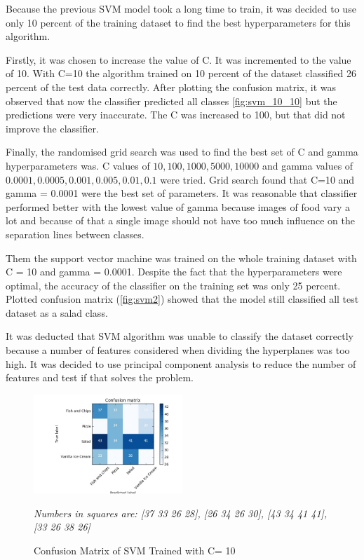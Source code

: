 Because the previous SVM model took a long time to train, it was decided to use only 10 percent of the training dataset to find the best hyperparameters for this algorithm.

Firstly, it was chosen to increase the value of C. It was incremented to the value of 10. With C=10 the algorithm trained on 10 percent of the dataset classified 26 percent of the test data correctly. After plotting the confusion matrix, it was observed that now the classifier predicted all classes \autoref{fig:svm_10_10} but the predictions were very inaccurate. The C was increased to 100, but that did not improve the classifier.

Finally, the  randomised grid search was used to find the  best set of C and gamma hyperparameters was. C values of  \(10, 100, 1000, 5000, 10000\) and gamma values  of \(0.0001, 0.0005, 0.001, 0.005, 0.01, 0.1\) were tried. Grid search found that C=10 and gamma = 0.0001 were the best set of parameters. It was reasonable that classifier performed better with the lowest value of gamma because images of food vary a lot and because of that a single image should not have too much influence on the separation lines between classes. 

Them  the support vector machine was trained on the whole training dataset with C = 10 and gamma = 0.0001. Despite the fact that the hyperparameters were optimal, the accuracy of the classifier on the training set was only 25 percent. Plotted confusion matrix (\autoref{fig:svm2}) showed that the model still classified all test dataset as a salad class. 

It was deducted that SVM algorithm was unable to classify the dataset correctly because a number of features considered when dividing the hyperplanes was too high. It was decided to use principal component analysis to reduce the number of features and test if that solves the problem.


\begin{figure}[h]
\centering
\includegraphics[width=0.5\textwidth]{Figures/svm_10_10.jpg}
\caption{Confusion Matrix of SVM Trained with C= 10}
 \textit{Numbers in squares are: [37 33 26 28],
 [26 34 26 30],
 [43 34 41 41],
 [33 26 38 26]}
\label{fig:svm_10_10}
\end{figure}

